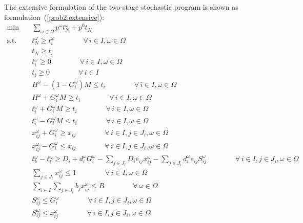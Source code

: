 \documentclass[11pt]{article}
\newcommand{\noi}{\noindent}
\begin{document}
	\noi The extensive formulation of the two-stage stochastic program is shown as formulation~(\ref{prob2:extensive}):
	\begin{subequations} \label{prob2:extensive}
		\begin{align}
		\min \quad & \sum_{\omega \in \Omega} p^\omega t_N^\omega + p^0 t_N \\
		\text{s.t.} \quad & t_N^\omega \geq t_i^\omega \qquad \qquad \forall \,i \in I, \omega \in \Omega \\
		& t_N \geq t_i \qquad \qquad \label{cons:tN}\\
		& t_i^\omega \geq 0 \qquad \qquad \forall \,i \in I, \omega \in \Omega\\
		& t_i \geq 0 \qquad \qquad \forall \,i \in I\\
		& H^\omega - (1 - G_i^\omega) M \leq t_i \qquad \qquad \forall \,i \in I, \omega \in \Omega \label{cons:F}\\
		& H^\omega + G_i^\omega M \geq t_i \qquad \qquad \forall \,i \in I, \omega \in \Omega \label{cons:G}\\
		& t_i^\omega + G_i^\omega M \geq t_i \qquad \qquad \forall \,i \in I, \omega \in \Omega \label{cons:tf1}\\
		& t_i^\omega - G_i^\omega M \leq t_i \qquad \qquad \forall \,i \in I, \omega \in \Omega \label{cons:tf2}\\
		& x_{ij}^\omega + G_i^\omega \geq x_{ij} \qquad \qquad \forall \,i \in I, j \in J_i, \omega \in \Omega \label{cons:xf1}\\
		& x_{ij}^\omega - G_i^\omega \leq x_{ij} \qquad \qquad \forall \,i \in I, j \in J_i, \omega \in \Omega \label{cons:xf2}\\
		& t_k^\omega - t_i^\omega \geq D_i + d_i^\omega G_i^\omega -\sum_{j \in J_i} D_i e_{ij} x_{ij}^\omega - \sum_{j \in J_i} d_i^\omega e_{ij} S_{ij}^\omega \qquad \qquad \forall \,i \in I, j \in J_i, \omega \in \Omega \label{cons:duration}\\
		& \sum_{j \in J_i} x_{ij}^\omega \leq 1 \qquad \qquad \forall \,i \in I, \omega \in \Omega \label{cons:crashLim}\\
		& \sum_{i \in I}\sum_{j \in J_i} b_jx_{ij}^\omega \leq B \qquad \qquad \forall \,\omega \in \Omega \label{cons:budget}\\
		& S_{ij}^\omega \leq G_i^\omega \qquad \qquad \forall \,i \in I, j \in J_i, \omega \in \Omega \label{cons:linearize1}\\
		& S_{ij}^\omega \leq x_{ij}^\omega \qquad \qquad \forall \,i \in I, j \in J_i, \omega \in \Omega \label{cons:linearize2}\\

\end{align}
\end{subequations}
\end{document}
